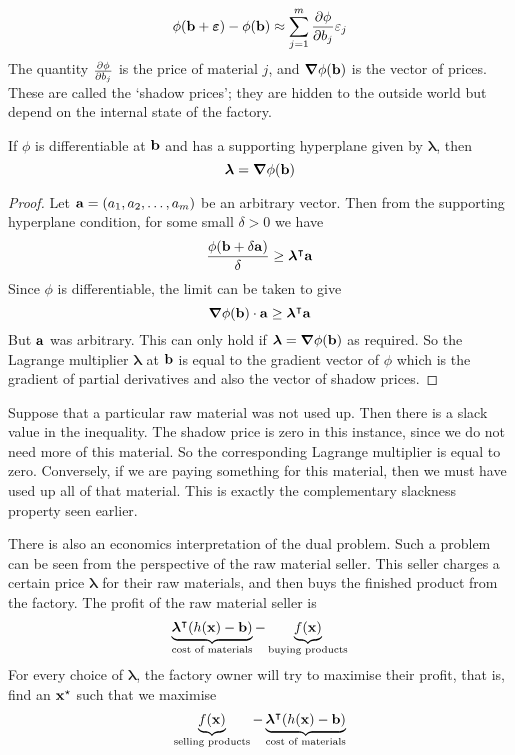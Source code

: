 \[
	\phi(\vb b + \bm\varepsilon) - \phi(\vb b) \approx \sum_{j=1}^m \pdv{\phi}{b_j}(\vb b) \varepsilon_j
\]
The quantity \( \pdv{\phi}{b_j}(\vb b) \) is the price of material \( j \), and \( \grad \phi(\vb b) \) is the vector of prices.
These are called the `shadow prices'; they are hidden to the outside world but depend on the internal state of the factory.

\begin{theorem}
	If \( \phi \) is differentiable at \( \vb b \) and has a supporting hyperplane given by \( \bm \lambda \), then
	\[
		\bm \lambda = \grad{\phi}(\vb b)
	\]
\end{theorem}
\begin{proof}
	Let \( \vb a = (a_1, a_2, \dots, a_m) \) be an arbitrary vector.
	Then from the supporting hyperplane condition, for some small \( \delta > 0 \) we have
	\[
		\frac{\phi(\vb b + \delta\vb a)}{\delta} \geq \bm \lambda^\intercal \vb a
	\]
	Since \( \phi \) is differentiable, the limit can be taken to give
	\[
		\grad{\phi}(\vb b) \cdot \vb a \geq \bm \lambda^\intercal \vb a
	\]
	But \( \vb a \) was arbitrary.
	This can only hold if \( \bm \lambda = \grad{\phi}(\vb b) \) as required.
	So the Lagrange multiplier \( \bm \lambda \) at \( \vb b \) is equal to the gradient vector of \( \phi \) which is the gradient of partial derivatives and also the vector of shadow prices.
\end{proof}

\noindent Suppose that a particular raw material was not used up.
Then there is a slack value in the inequality.
The shadow price is zero in this instance, since we do not need more of this material.
So the corresponding Lagrange multiplier is equal to zero.
Conversely, if we are paying something for this material, then we must have used up all of that material.
This is exactly the complementary slackness property seen earlier.

There is also an economics interpretation of the dual problem.
Such a problem can be seen from the perspective of the raw material seller.
This seller charges a certain price \( \bm \lambda \) for their raw materials, and then buys the finished product from the factory.
The profit of the raw material seller is
\[
	\underbrace{\bm\lambda^\intercal (h(\vb x) - \vb b)}_{\text{cost of materials}} - \underbrace{f(\vb x)}_{\text{buying products}}
\]
For every choice of \( \bm\lambda \), the factory owner will try to maximise their profit, that is, find an \( \vb x^\star \) such that we maximise
\[
	\underbrace{f(\vb x)}_{\text{selling products}} - \underbrace{\bm\lambda^\intercal (h(\vb x) - \vb b)}_{\text{cost of materials}}
\]
